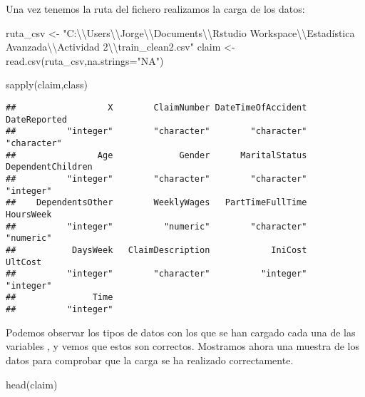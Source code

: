 \documentclass[
  a4paper]{article}
\newenvironment{Shaded}{\begin{snugshade}}{\end{snugshade}}
\newcommand{\AttributeTok}[1]{\textcolor[rgb]{0.77,0.63,0.00}{#1}}
\newcommand{\FunctionTok}[1]{\textcolor[rgb]{0.00,0.00,0.00}{#1}}
\newcommand{\NormalTok}[1]{#1}
\newcommand{\OtherTok}[1]{\textcolor[rgb]{0.56,0.35,0.01}{#1}}
\newcommand{\SpecialCharTok}[1]{\textcolor[rgb]{0.00,0.00,0.00}{#1}}
\newcommand{\StringTok}[1]{\textcolor[rgb]{0.31,0.60,0.02}{#1}}
\begin{document}
Una vez tenemos la ruta del fichero realizamos la carga de los datos:

\begin{Shaded}
\begin{Highlighting}[]
\NormalTok{ruta\_csv }\OtherTok{\textless{}{-}} \StringTok{"C:}\SpecialCharTok{\textbackslash{}\textbackslash{}}\StringTok{Users}\SpecialCharTok{\textbackslash{}\textbackslash{}}\StringTok{Jorge}\SpecialCharTok{\textbackslash{}\textbackslash{}}\StringTok{Documents}\SpecialCharTok{\textbackslash{}\textbackslash{}}\StringTok{Rstudio Workspace}\SpecialCharTok{\textbackslash{}\textbackslash{}}\StringTok{Estadística Avanzada}\SpecialCharTok{\textbackslash{}\textbackslash{}}\StringTok{Actividad 2}\SpecialCharTok{\textbackslash{}\textbackslash{}}\StringTok{train\_clean2.csv"}
\NormalTok{claim }\OtherTok{\textless{}{-}} \FunctionTok{read.csv}\NormalTok{(ruta\_csv,}\AttributeTok{na.strings=}\StringTok{"NA"}\NormalTok{)}

\FunctionTok{sapply}\NormalTok{(claim,class)}
\end{Highlighting}
\end{Shaded}

\begin{verbatim}
##                  X        ClaimNumber DateTimeOfAccident       DateReported 
##          "integer"        "character"        "character"        "character" 
##                Age             Gender      MaritalStatus  DependentChildren 
##          "integer"        "character"        "character"          "integer" 
##    DependentsOther        WeeklyWages   PartTimeFullTime          HoursWeek 
##          "integer"          "numeric"        "character"          "numeric" 
##           DaysWeek   ClaimDescription            IniCost            UltCost 
##          "integer"        "character"          "integer"          "integer" 
##               Time 
##          "integer"
\end{verbatim}

Podemos observar los tipos de datos con los que se han cargado cada una
de las variables , y vemos que estos son correctos. Mostramos ahora una
muestra de los datos para comprobar que la carga se ha realizado
correctamente.

\begin{Shaded}
\begin{Highlighting}[]
\FunctionTok{head}\NormalTok{(claim)}
\end{Highlighting}
\end{Shaded}
\end{document}
